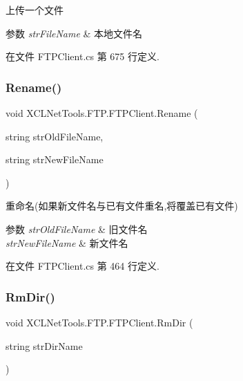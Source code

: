 上传一个文件 


\begin{DoxyParams}{参数}
{\em str\+File\+Name} & 本地文件名\\
\hline
\end{DoxyParams}


在文件 F\+T\+P\+Client.\+cs 第 675 行定义.

\mbox{\label{class_x_c_l_net_tools_1_1_f_t_p_1_1_f_t_p_client_aaadb1ae86c64e8ec958e8333fc6b9bce}} 
\subsubsection{\texorpdfstring{Rename()}{Rename()}}
{\footnotesize\ttfamily void X\+C\+L\+Net\+Tools.\+F\+T\+P.\+F\+T\+P\+Client.\+Rename (\begin{DoxyParamCaption}\item[{string}]{str\+Old\+File\+Name,  }\item[{string}]{str\+New\+File\+Name }\end{DoxyParamCaption})}



重命名(如果新文件名与已有文件重名,将覆盖已有文件) 


\begin{DoxyParams}{参数}
{\em str\+Old\+File\+Name} & 旧文件名\\
\hline
{\em str\+New\+File\+Name} & 新文件名\\
\hline
\end{DoxyParams}


在文件 F\+T\+P\+Client.\+cs 第 464 行定义.

\mbox{\label{class_x_c_l_net_tools_1_1_f_t_p_1_1_f_t_p_client_a4c4167a6afd00ed6e1f5303e59555037}} 
\subsubsection{\texorpdfstring{Rm\+Dir()}{RmDir()}}
{\footnotesize\ttfamily void X\+C\+L\+Net\+Tools.\+F\+T\+P.\+F\+T\+P\+Client.\+Rm\+Dir (\begin{DoxyParamCaption}\item[{string}]{str\+Dir\+Name }\end{DoxyParamCaption})}




